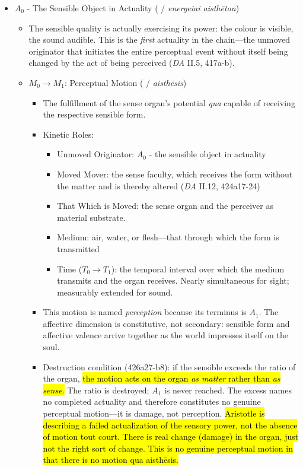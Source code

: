 \begin{itemize}
    \item $A_0$ - The Sensible Object in Actuality (  / \textit{energeiai aisthēton})
    \begin{itemize}
        \item The sensible quality is actually exercising its power: the colour is visible, the sound audible. This is the \textit{first} actuality in the chain---the unmoved originator that initiates the entire perceptual event without itself being changed by the act of being perceived (\textit{DA} II.5, 417a-b).
        \item $M_0 \rightarrow M_1$: Perceptual Motion ( / \textit{aisthēsis})
        \begin{itemize}
            \item The fulfillment of the sense organ's potential \textit{qua} capable of receiving the respective sensible form.
            \item Kinetic Roles:
            \begin{itemize}
                \item Unmoved Originator: $A_0$ - the sensible object in actuality
                \item Moved Mover: the sense faculty, which receives the form without the matter and is thereby altered (\textit{DA} II.12, 424a17-24)
                \item That Which is Moved: the sense organ and the perceiver as material substrate.
                \item Medium: air, water, or flesh---that through which the form is transmitted
                \item Time ($T_0 \rightarrow T_1$): the temporal interval over which the medium transmits and the organ receives. Nearly simultaneous for sight; measurably extended for sound.
            \end{itemize}
        \item This motion is named \textit{perception} because its terminus is $A_1$. The affective dimension is constitutive, not secondary: sensible form and affective valence arrive together as the world impresses itself on the soul.
        \item Destruction condition (426a27-b8): if the sensible exceeds the ratio of the organ, \hl{the motion acts on the organ \textit{as matter} rather than \textit{as sense}.} The ratio is destroyed; $A_1$ is never reached. The excess names no completed actuality and therefore constitutes no genuine perceptual motion---it is damage, not perception. \hl{Aristotle is describing a failed actualization of the sensory power, not the absence of motion tout court. There is real change (damage) in the organ, just not the right sort of change. This is no genuine perceptual motion in that there is no motion qua aisthēsis.}
        \end{itemize}
    \end{itemize}
\end{itemize}

